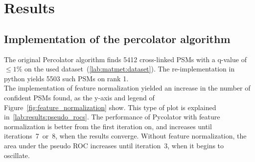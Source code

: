 \chapter{Results}
\label{results}


\section{Implementation of the percolator algorithm}
The original Percolator algorithm finds 5412 cross-linked PSMs with a q-value of $\leq1\%$ on the used dataset~(\ref{lab:matmet:dataset}). The re-implementation in python yields 5503 such PSMs on rank 1.\\
The implementation of feature normalization yielded an increase in the number of confident PSMs found, as the y-axis and legend of Figure~\ref{fig:feature_normalization} show. This type of plot is explained in~\autoref{lab:results:pseudo_rocs}. The performance of Pycolator with feature normalization is better from the first iteration on, and increases until iterations~7~or~8, when the results converge. Without feature normalization, the area under the pseudo ROC increases until iteration~3, when it begins to oscillate. \\
\renewcommand{\baselinestretch}{0.9}
